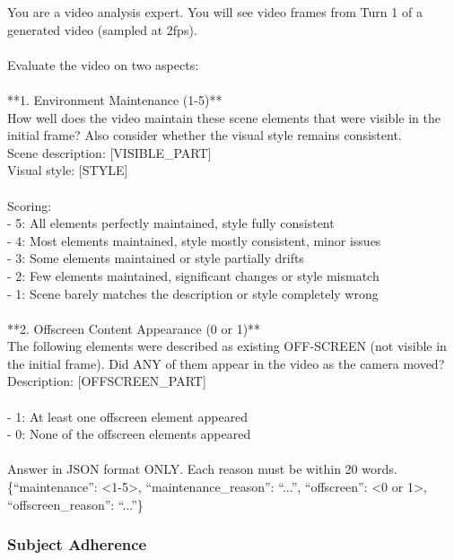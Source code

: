 \documentclass{llmxive}
\begin{document}
\begin{tcolorbox}[d2box, title={Scene Adherence Prompt}]
\ttfamily\scriptsize
You are a video analysis expert. You will see video frames from Turn 1 of a generated video (sampled at 2fps).\\
\\
Evaluate the video on two aspects:\\
\\
**1. Environment Maintenance (1-5)**\\
How well does the video maintain these scene elements that were visible in the initial frame? Also consider whether the visual style remains consistent.\\
Scene description: [VISIBLE\_PART]\\
Visual style: [STYLE]\\
\\
Scoring:\\
- 5: All elements perfectly maintained, style fully consistent\\
- 4: Most elements maintained, style mostly consistent, minor issues\\
- 3: Some elements maintained or style partially drifts\\
- 2: Few elements maintained, significant changes or style mismatch\\
- 1: Scene barely matches the description or style completely wrong\\
\\
**2. Offscreen Content Appearance (0 or 1)**\\
The following elements were described as existing OFF-SCREEN (not visible in the initial frame). Did ANY of them appear in the video as the camera moved?\\
Description: [OFFSCREEN\_PART]\\
\\
- 1: At least one offscreen element appeared\\
- 0: None of the offscreen elements appeared\\
\\
Answer in JSON format ONLY. Each reason must be within 20 words.\\
\{``maintenance'': <1-5>, ``maintenance\_reason'': ``...'', ``offscreen'': <0 or 1>, ``offscreen\_reason'': ``...''\}
\end{tcolorbox}

\subsubsection{Subject Adherence}
\label{app:subject_adherence_detail}
\end{document}

